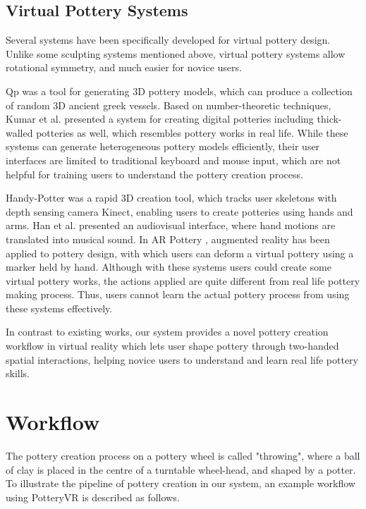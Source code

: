\documentclass{svjour3}                     %
\begin{document}
\subsection{Virtual Pottery Systems}
\label{sec:2.3}


Several systems have been specifically developed for virtual pottery design. Unlike some sculpting systems mentioned above, virtual pottery systems allow rotational symmetry, and much easier for novice users.

Qp \cite{koutsoudis2009qp} was a tool for generating 3D pottery models, which can produce a collection of random 3D ancient greek vessels.
Based on number-theoretic techniques, Kumar et al. \cite{kumar2011wheel} presented a system for creating digital potteries including thick-walled potteries as well, which resembles pottery works in real life.
While these systems can generate heterogeneous pottery models efficiently, their user interfaces are limited to traditional keyboard and mouse input, which are not helpful for training users to understand the pottery creation process.

Handy-Potter \cite{murugappan2013handy} was a rapid 3D creation tool, which tracks user skeletons with depth sensing camera Kinect, enabling users to create potteries using hands and arms.
Han et al. \cite{han2014virtual} presented an audiovisual interface, where hand motions are translated into musical sound.
In AR Pottery \cite{han2007ar}, augmented reality has been applied to pottery design, with which users can deform a virtual pottery using a marker held by hand.
Although with these systems users could create some virtual pottery works, the actions applied are quite different from real life pottery making process. Thus, users cannot learn the actual pottery process from using these systems effectively.

In contrast to existing works, our system provides a novel pottery creation workflow in virtual reality which lets user shape pottery through two-handed spatial interactions, helping novice users to understand and learn real life pottery skills.



\section{Workflow}
\label{sec:3}

The pottery creation process on a pottery wheel is called "throwing", where a ball of clay is placed in the centre of a turntable wheel-head, and shaped by a potter.
To illustrate the pipeline of pottery creation in our system, an example workflow using PotteryVR is described as follows.
\end{document}

